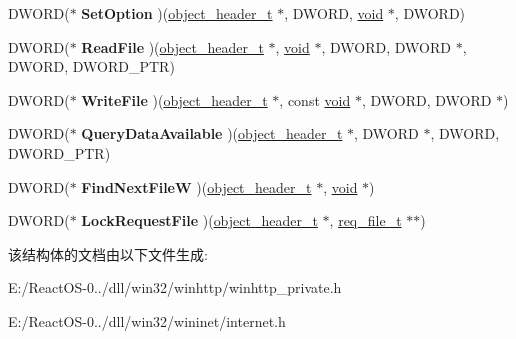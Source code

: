 \begin{DoxyCompactItemize}
\item 
\mbox{\label{structobject__vtbl__t_ad032c977845a82a17dacc2822c570fce}} 
D\+W\+O\+RD($\ast$ {\bfseries Set\+Option} )(\hyperlink{struct__object__header__t}{object\+\_\+header\+\_\+t} $\ast$, D\+W\+O\+RD, \hyperlink{interfacevoid}{void} $\ast$, D\+W\+O\+RD)
\item 
\mbox{\label{structobject__vtbl__t_acd6dd418f6b7d48e6d8eb252521326d2}} 
D\+W\+O\+RD($\ast$ {\bfseries Read\+File} )(\hyperlink{struct__object__header__t}{object\+\_\+header\+\_\+t} $\ast$, \hyperlink{interfacevoid}{void} $\ast$, D\+W\+O\+RD, D\+W\+O\+RD $\ast$, D\+W\+O\+RD, D\+W\+O\+R\+D\+\_\+\+P\+TR)
\item 
\mbox{\label{structobject__vtbl__t_ae86ec2abb852493e888dcf8ac1438318}} 
D\+W\+O\+RD($\ast$ {\bfseries Write\+File} )(\hyperlink{struct__object__header__t}{object\+\_\+header\+\_\+t} $\ast$, const \hyperlink{interfacevoid}{void} $\ast$, D\+W\+O\+RD, D\+W\+O\+RD $\ast$)
\item 
\mbox{\label{structobject__vtbl__t_a60d807e9ac60380e747e75943f249160}} 
D\+W\+O\+RD($\ast$ {\bfseries Query\+Data\+Available} )(\hyperlink{struct__object__header__t}{object\+\_\+header\+\_\+t} $\ast$, D\+W\+O\+RD $\ast$, D\+W\+O\+RD, D\+W\+O\+R\+D\+\_\+\+P\+TR)
\item 
\mbox{\label{structobject__vtbl__t_a35a87810d988962550b437f0372939a7}} 
D\+W\+O\+RD($\ast$ {\bfseries Find\+Next\+FileW} )(\hyperlink{struct__object__header__t}{object\+\_\+header\+\_\+t} $\ast$, \hyperlink{interfacevoid}{void} $\ast$)
\item 
\mbox{\label{structobject__vtbl__t_ae57ac45e9a82d9833ed4fae3f3ad2cab}} 
D\+W\+O\+RD($\ast$ {\bfseries Lock\+Request\+File} )(\hyperlink{struct__object__header__t}{object\+\_\+header\+\_\+t} $\ast$, \hyperlink{structreq__file__t}{req\+\_\+file\+\_\+t} $\ast$$\ast$)
\end{DoxyCompactItemize}


该结构体的文档由以下文件生成\+:\begin{DoxyCompactItemize}
\item 
E\+:/\+React\+O\+S-\/0../dll/win32/winhttp/winhttp\+\_\+private.\+h\item 
E\+:/\+React\+O\+S-\/0../dll/win32/wininet/internet.\+h\end{DoxyCompactItemize}
